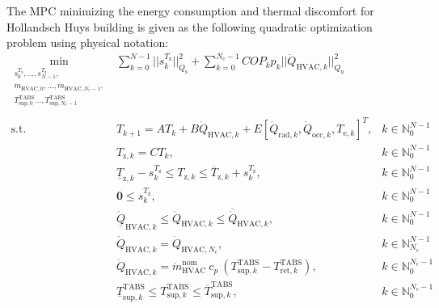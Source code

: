 \documentclass[10pt]{article}
\begin{document}
The MPC minimizing  the energy consumption and  thermal discomfort 
for Hollandsch Huys building is given as the following quadratic optimization problem using physical notation:
\begin{subequations}
\label{eq:mpc_general}
\begin{align}
 \min_{\substack{s^{T_{\text{z}}}_0, \ldots, s^{T_{\text{z}}}_{N-1}, \\
 \dot{m}_{\text{HVAC},0}, \ldots,  \dot{m}_{\text{HVAC},N_{\text{c}}-1}, \\
   T_{\text{sup},0}^{\text{TABS}}  \ldots,  T_{\text{sup},N_{\text{c}}-1}^{\text{TABS}} \\
 }} & \sum_{k=0}^{N-1}  
 || s^{T_{\text{z}}}_k ||_{Q_{\text{s}}}^2 +  \sum_{k=0}^{N_{\text{c}}-1} COP_k p_k ||\dot{Q}_{\text{HVAC},k} ||_{Q_\text{u}}^2   
 \label{eq:mpc_general:cost}\\
  \text{s.t.} \ & T_{k+1} = A T_k+ B \dot{Q}_{\text{HVAC},k} +E [\dot{Q}_{\text{rad},k}, \dot{Q}_{\text{occ},k}, T_{\text{e},k}]^T, & k \in \mathbb{N}_{0}^{N-1} \label{eq:mpc_general:x} \\
  & T_{\text{z},k} = C T_k, & k \in \mathbb{N}_{0}^{N-1} \label{eq:mpc_general:y} \\
  & \underline{T}_{\text{z},k} - s^{T_{\text{z}}}_k \le T_{\text{z},k} \le \overline{T}_{\text{z},k} + s^{T_{\text{z}}}_k, & k \in \mathbb{N}_{0}^{N-1} \label{eq:mpc_general:zone} \\
   & \mathbf{0} \le s^{T_{\text{z}}}_k  ,  & k \in \mathbb{N}_{0}^{N-1} \label{eq:mpc_general:lb_sk}\\
  &  \underline{\dot{Q}}_{\text{HVAC},k} \le \dot{Q}_{\text{HVAC},k} \le \overline{\dot{Q}}_{\text{HVAC},k},  & k \in \mathbb{N}_{0}^{N-1} \label{eq:mpc_general:ub}\\
    & \dot{Q}_{\text{HVAC},k} = \dot{Q}_{\text{HVAC},N_{\text{c}}} , & k \in \mathbb{N}_{N_{\text{c}}}^{N-1} \label{eq:mpc_general:move_block} \\
   & \dot{Q}_{\text{HVAC},k}  = \dot{m}_{\text{HVAC}}^{\text{nom}} \ c_p \ (T_{\text{sup},k}^{\text{TABS}} -  T_{\text{ret},k}^{\text{TABS}}),  & k \in \mathbb{N}_{0}^{N_{\text{c}}-1} \label{eq:NLP_postprocess:heat_equation} \\
   &  \underline{T}_{\text{sup},k}^{\text{TABS}} \le T_{\text{sup},k}^{\text{TABS}} \le \overline{T}_{\text{sup},k}^{\text{TABS}},
    & k \in \mathbb{N}_{0}^{N_{\text{c}}-1}  \label{eq:NLP_postprocess:tsup_minmax}\\

\end{align}
\end{subequations}
\end{document}
